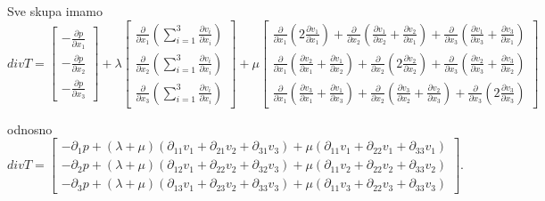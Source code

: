 \documentclass[a4paper,oneside,12pt]{memoir} %
\begin{document}
Sve skupa imamo
\[
divT
=
\begin{bmatrix}
    -\frac{\partial p}{\partial x_1} \\
    -\frac{\partial p}{\partial x_2} \\
    -\frac{\partial p}{\partial x_3}
\end{bmatrix} + 
\lambda \begin{bmatrix}
     \frac{\partial}{\partial x_1} (\sum_{i=1}^{3} \frac{\partial v_i}{\partial x_i}) \\
     \frac{\partial}{\partial x_2} (\sum_{i=1}^{3} \frac{\partial v_i}{\partial x_i}) \\
     \frac{\partial}{\partial x_3} (\sum_{i=1}^{3} \frac{\partial v_i}{\partial x_i})
\end{bmatrix} + \mu
\begin{bmatrix}
    \frac{\partial}{\partial x_1} (2 \frac{\partial v_1}{\partial x_1}) + \frac{\partial}{\partial x_2} (\frac{\partial v_1}{\partial x_2}+\frac{\partial v_2}{\partial x_1}) + \frac{\partial}{\partial x_3} (\frac{\partial v_1}{\partial x_3}+\frac{\partial v_3}{\partial x_1}) \\
    \frac{\partial}{\partial x_1} (\frac{\partial v_2}{\partial x_1}+\frac{\partial v_1}{\partial x_2}) + \frac{\partial}{\partial x_2} (2 \frac{\partial v_2}{\partial x_2}) + \frac{\partial}{\partial x_3} (\frac{\partial v_2}{\partial x_3}+\frac{\partial v_3}{\partial x_2}) \\
    \frac{\partial}{\partial x_1} (\frac{\partial v_3}{\partial x_1}+\frac{\partial v_1}{\partial x_3}) + \frac{\partial}{\partial x_2} (\frac{\partial v_3}{\partial x_2}+\frac{\partial v_2}{\partial x_3}) + \frac{\partial}{\partial x_3} (2 \frac{\partial v_3}{\partial x_3})
\end{bmatrix}
\]

odnosno
\[
divT
=
\begin{bmatrix}
    -\partial_1 p + (\lambda + \mu) (\partial_{11} v_1 + \partial_{21} v_2 + \partial_{31} v_3) + \mu (\partial_{11} v_1 + \partial_{22} v_1 + \partial_{33} v_1) \\
    -\partial_2 p + (\lambda + \mu) (\partial_{12} v_1 + \partial_{22} v_2 + \partial_{32} v_3) + \mu (\partial_{11} v_2 + \partial_{22} v_2 + \partial_{33} v_2) \\
    -\partial_3 p + (\lambda + \mu) (\partial_{13} v_1 + \partial_{23} v_2 + \partial_{33} v_3) + \mu (\partial_{11} v_3 + \partial_{22} v_3 + \partial_{33} v_3)
\end{bmatrix}.
\]
\end{document}
